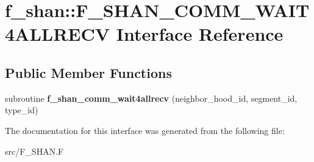 \hypertarget{interfacef__shan_1_1F__SHAN__COMM__WAIT4ALLRECV}{}\section{f\+\_\+shan\+:\+:F\+\_\+\+S\+H\+A\+N\+\_\+\+C\+O\+M\+M\+\_\+\+W\+A\+I\+T4\+A\+L\+L\+R\+E\+CV Interface Reference}
\label{interfacef__shan_1_1F__SHAN__COMM__WAIT4ALLRECV}
\subsection*{Public Member Functions}
\begin{DoxyCompactItemize}
\item 
subroutine {\bfseries f\+\_\+shan\+\_\+comm\+\_\+wait4allrecv} (neighbor\+\_\+hood\+\_\+id, segment\+\_\+id, type\+\_\+id)\hypertarget{interfacef__shan_1_1F__SHAN__COMM__WAIT4ALLRECV_a2da1f8254f4fbc1409b2d52f48c7b574}{}\label{interfacef__shan_1_1F__SHAN__COMM__WAIT4ALLRECV_a2da1f8254f4fbc1409b2d52f48c7b574}

\end{DoxyCompactItemize}


The documentation for this interface was generated from the following file\+:\begin{DoxyCompactItemize}
\item 
src/F\+\_\+\+S\+H\+A\+N.\+F\end{DoxyCompactItemize}
